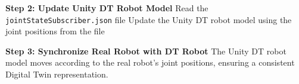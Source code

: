 \begin{itemize}
\begin{algorithm}
\begin{algorithmic}[1]
            \State \textbf{Step 2: Update Unity \ac{DT} Robot Model}
                \State Read the \texttt{jointStateSubscriber.json} file
                \State Update the Unity \ac{DT} robot model using the joint positions from the file
            \EndWhile
    
            \State \textbf{Step 3: Synchronize Real Robot with \ac{DT} Robot}
            \State The Unity \ac{DT} robot model moves according to the real robot’s joint positions, ensuring a consistent Digital Twin representation.
        \end{algorithmic}
    \end{algorithm}
    
\end{itemize}





